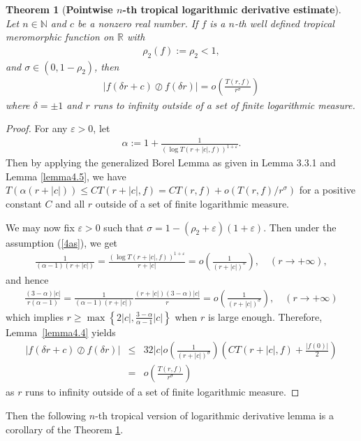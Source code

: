 \documentclass{article}
\newtheorem{theorem}[defin]{Theorem}
\begin{document}
\begin{theorem}[\textbf{Pointwise $n$-th tropical logarithmic derivative estimate}]\label{theorem 4.6}
     Let $n\in\mathbb{N}$ and $c$ be a nonzero real number. If $f$ is a $n$-th well defined tropical meromorphic function on $\mathbb{R}$ with
    \begin{eqnarray}\label{4as}
        \rho_{2}(f):=\rho_{2}<1,
    \end{eqnarray}
    and $\sigma\in(0, 1-\rho_{2})$, then 
    \begin{eqnarray*}
        \left|f(\delta r+c)\oslash f(\delta r)\right|=o\left(\frac{T(r, f)}{r^{\sigma}}\right)
    \end{eqnarray*}
    where $\delta=\pm1$ and $r$ runs to infinity outside of a set of finite logarithmic measure.
\end{theorem}
\begin{proof}
    For any $\varepsilon>0$, let
    \begin{eqnarray*}
        \alpha:=1+\frac{1}{(\log T(r+|c|, f))^{1+\varepsilon}}.
    \end{eqnarray*}
    Then by applying the generalized Borel Lemma as given in Lemma 3.3.1 \cite{Ye} and Lemma \ref{lemma4.5}, we have $T(\alpha(r+|c|))\leq CT(r+|c|, f)=CT(r, f)+o(T(r, f)/r^{\sigma})$ for a positive constant $C$ and all $r$ outside of a set of finite logarithmic measure. 
    
    We may now fix $\varepsilon>0$ such that $\sigma=1-(\rho_{2}+\varepsilon)(1+\varepsilon)$. Then under the assumption (\ref{4as}), we get
    \begin{eqnarray*}
        \frac{1}{(\alpha-1)(r+|c|)}=\frac{(\log T(r+|c|, f))^{1+\varepsilon}}{r+|c|}=o\left(\frac{1}{(r+|c|)^{\sigma}}\right), \quad (r\rightarrow +\infty),
    \end{eqnarray*}
    and hence
    \begin{eqnarray*}
        \frac{(3-\alpha)|c|}{r(\alpha-1)}=\frac{1}{(\alpha-1)(r+|c|)}\frac{(r+|c|)(3-\alpha)|c|}{r}=o\left(\frac{1}{(r+|c|)^{\sigma}}\right), \quad (r\rightarrow +\infty)
    \end{eqnarray*}
    which implies $r\geq \max\left\{ 2|c|, \frac{3-\alpha}{\alpha-1}|c|\right\}$ when $r$ is large enough. Therefore, Lemma~\ref{lemma4.4} yields
    \begin{eqnarray*}
        |f(\delta r+c)\oslash f(\delta r)|&\leq& 32|c|o\left(\frac{1}{(r+|c|)^{\sigma}}\right)\left(CT(r+|c|, f)+\frac{|f(0)|}{2}\right)\\
        &=&o\left(\frac{T(r, f)}{r^{\sigma}}\right)
    \end{eqnarray*}
    as $r$ runs to infinity outside of a set of finite logarithmic measure.
\end{proof}
Then the following $n$-th tropical version of logarithmic derivative lemma is a corollary of the Theorem \ref{theorem 4.6}.
\end{document}
